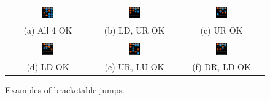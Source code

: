 \documentclass[10pt]{sigplanconf}
\begin{document}
\begin{figure}[t]
	\begin{center}
	\begin{tabular}{ccc}
		\includegraphics[width=0.14\textwidth]{test-basic-yes.png} & 
		\includegraphics[width=0.14\textwidth]{test-footswitch-bracket-yes.png} &
		\includegraphics[width=0.14\textwidth]{test-reset-footing-yes.png} \\
		(a) All 4 OK
		&
		(b) LD, UR OK
		&
		(c) UR OK
		\\
		\\
		\includegraphics[width=0.14\textwidth]{test-propagate-through-ud-yes.png} &
		\includegraphics[width=0.14\textwidth]{test-reset-subsequent-stream-yes.png} &
		\includegraphics[width=0.14\textwidth]{test-footswitch-jack-yes.png} \\
		(d) LD OK
		&
		(e) UR, LU OK
		&
		(f) DR, LD OK
	\end{tabular}
	\end{center}
	\caption{Examples of bracketable jumps.}
	\label{fig:tests}
\end{figure}
\end{document}
